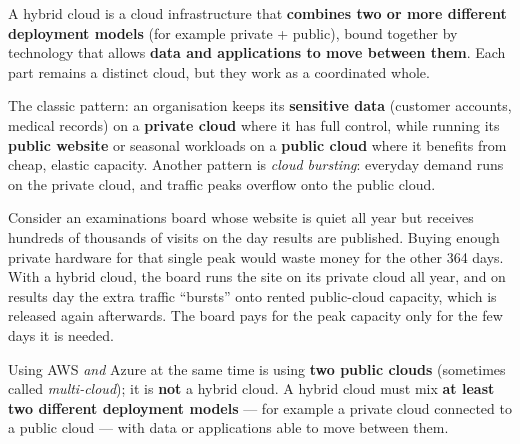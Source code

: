 \documentclass[11pt]{article}
\newcommand{\cle}[1]{{\popxbold\color{popdark}#1}}
\begin{document}
\begin{definition}
A \cle{hybrid cloud} is a cloud infrastructure that \textbf{combines two or more different deployment models} (for example private + public), bound together by technology that allows \textbf{data and applications to move between them}. Each part remains a distinct cloud, but they work as a coordinated whole.
\end{definition}

The classic pattern: an organisation keeps its \textbf{sensitive data} (customer accounts, medical records) on a \textbf{private cloud} where it has full control, while running its \textbf{public website} or seasonal workloads on a \textbf{public cloud} where it benefits from cheap, elastic capacity. Another pattern is \emph{cloud bursting}: everyday demand runs on the private cloud, and traffic peaks overflow onto the public cloud.

\begin{exemplebox}
Consider an examinations board whose website is quiet all year but receives hundreds of thousands of visits on the day results are published. Buying enough private hardware for that single peak would waste money for the other 364 days. With a hybrid cloud, the board runs the site on its private cloud all year, and on results day the extra traffic ``bursts'' onto rented public-cloud capacity, which is released again afterwards. The board pays for the peak capacity only for the few days it is needed.
\end{exemplebox}

\begin{attention}
Using AWS \emph{and} Azure at the same time is using \textbf{two public clouds} (sometimes called \emph{multi-cloud}); it is \textbf{not} a hybrid cloud. A hybrid cloud must mix \textbf{at least two different deployment models} --- for example a private cloud connected to a public cloud --- with data or applications able to move between them.
\end{attention}
\end{document}
